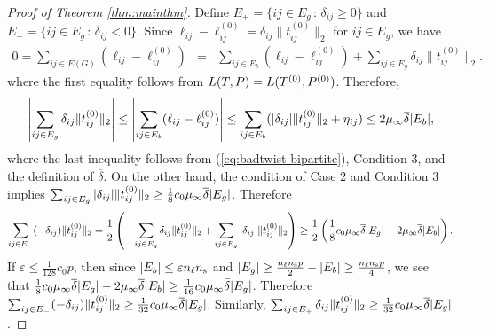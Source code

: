 \begin{proof}[Proof of Theorem \ref{thm:mainthm}]
Define $E_{+}=\{ij\in E_{g}\,:\,\delta_{ij}\ge0\}$ and $E_{-}=\{ij\in E_{g}\,:\,\delta_{ij}<0\}$.
Since $\ell_{ij}-\ell_{ij}^{(0)}=\delta_{ij}\|t_{ij}^{(0)}\|_2$
for $ij\in E_{g}$, we have 
\begin{eqnarray*}
0=\sum_{ij \in E(G)}(\ell_{ij}-\ell_{ij}^{(0)}) & = & \sum_{ij\in E_{b}}(\ell_{ij}-\ell_{ij}^{(0)})+\sum_{ij\in E_{g}}\delta_{ij}\|t_{ij}^{(0)}\|_2.
\end{eqnarray*}
where the first equality follows from $L(T,P) = L(T^{(0)}, P^{(0)})$.  Therefore, 
\begin{eqnarray*}
	\left| \sum_{ij\in E_{g}}\delta_{ij}\|t_{ij}^{(0)}\|_2 \right|
	\le \left| \sum_{ij\in E_{b}}(\ell_{ij}-\ell_{ij}^{(0)}) \right|
	\le \sum_{ij\in E_{b}}(|\delta_{ij}|\|t_{ij}^{(0)}\|_2+\eta_{ij}) 
	\le 2\mu_{\infty}\overline{\delta}|E_{b}|,
\end{eqnarray*}
where the last inequality follows from (\ref{eq:badtwist-bipartite}), Condition 3, and the definition of $\overline{\delta}$. On the other hand, the condition of Case 2 and Condition 3 implies 
$\sum_{ij\in E_{g}}|\delta_{ij}|\|t_{ij}^{(0)}\|_2 \ge \frac{1}{8}c_0 \mu_{\infty}\overline{\delta}|E_g|$. 
Therefore
\[
	\sum_{ij \in E_-} (-\delta_{ij}) \|t_{ij}^{(0)}\|_2
	= \frac{1}{2}\left( -\sum_{ij\in E_{g}}\delta_{ij}\|t_{ij}^{(0)}\|_2 + \sum_{ij\in E_{g}}|\delta_{ij}|\|t_{ij}^{(0)}\|_2\right)
	\ge \frac{1}{2} \left(\frac{1}{8} c_0 \mu_{\infty}\overline{\delta}|E_g| - 2\mu_{\infty}\overline{\delta}|E_{b}|\right).
\]
If $\varepsilon \le \frac{1}{128}c_0p$, then 
since $|E_b| \le \varepsilon n_\ell n_\text{s}$ and $|E_g| \ge \frac{n_\ell n_\text{s} p}{2} - |E_b| \ge \frac{n_\ell n_\text{s} p}{4}$, 
we see that $\frac{1}{8} c_0 \mu_{\infty}\overline{\delta}|E_g| - 2\mu_{\infty}\overline{\delta}|E_{b}| \ge \frac{1}{16}c_0\mu_{\infty} \bar{\delta}|E_g|$.
Therefore $\sum_{ij\in E_{-}}(-\delta_{ij})\|t_{ij}^{(0)}\|_2 \ge\frac{1}{32}c_{0}\mu_{\infty} \overline{\delta}|E_{g}|$.
Similarly, $\sum_{ij\in E_{+}} \delta_{ij}\|t_{ij}^{(0)}\|_2 \ge \frac{1}{32}c_{0}\mu_{\infty} \overline{\delta}|E_{g}|$.


\end{proof}
